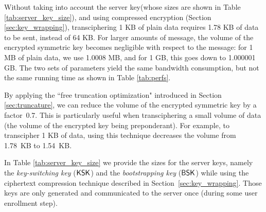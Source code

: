 Without taking into account the server key\ifeprint(whose sizes are shown in Table \ref{tab:server_key_size})\fi, and using compressed encryption (Section \ref{sec:key_wrapping}),  transciphering 1 KB of plain data requires 1.78 KB of data to be sent, instead of 64 KB. For larger amounts of message, the volume of the encrypted symmetric key becomes negligible with respect to the message: for 1 MB of plain data, we use 1.0008 MB, and for 1 GB, this goes down to 1.000001 GB. The two sets of parameters yield the same bandwidth consumption, but not the same running time as shown in Table \ref{tab:perfs}.



By applying the ``free truncation optimization" introduced in Section \ref{sec:truncature}, we can reduce the volume of the encrypted symmetric key by a factor~0.7. This is particularly useful when transciphering a small volume of data (the volume of the encrypted key being preponderant). For example, to transcipher 1 KB of data, using this technique decreases the volume from 1.78~KB to 1.54~KB. 

In Table \ref{tab:server_key_size} we provide the sizes for the server keys, namely the \emph{key-switching key} ($\textsf{KSK}$) and the \emph{bootstrapping key} ($\textsf{BSK}$) while using the ciphertext compression technique described in Section~\ref{sec:key_wrapping}. Those keys are only generated and communicated to the server once (during some user enrollment step).

\begin{table}[t!]
  \centering
  \caption{Size of the server keys for the two considered sets of parameters. 
    \label{tab:server_key_size}}
  
  \renewcommand{\arraystretch}{1.2}  %
\end{table}




